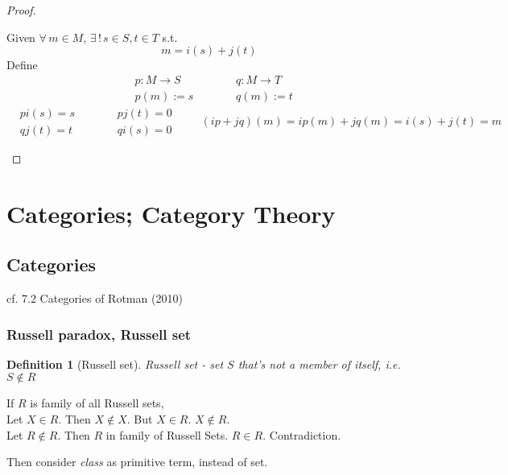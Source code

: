 \documentclass[10pt]{amsart}
\newtheorem{definition}{Definition}
\begin{document}
\begin{multicols*}{2}
\begin{proof}
\begin{itemize}
Given $\forall \, m \in M$, $\exists \, ! \, s\in S,t\in T$ s.t. 
\[
m=i(s) + j(t)
\]
Define 
\[
\begin{aligned}
	& p:M \to S \\ 
	& p(m) := s
\end{aligned} \qquad \, \begin{aligned}
	& q: M \to T \\ 
	& q(m) := t
\end{aligned}
\]
\[
\begin{aligned}
	& pi(s) = s \\ 
	& qj(t) = t 
\end{aligned} \qquad \, \begin{aligned}
& pj(t) =0  \\
& qi(s) = 0 \end{aligned} \qquad \, 
(ip+jq)(m) = ip(m) + jq(m) = i(s) + j(t) = m 
\]
\end{itemize}
\end{proof}

\section{Categories; Category Theory}  

\subsection{Categories}

cf. 7.2 Categories of Rotman (2010) \cite{JRotman2010}

\subsubsection{Russell paradox, Russell set}  

\begin{definition}[Russell set]
Russell set  - set $S$ that's not a member of itself, i.e. $S\notin R$
\end{definition}

If $R$ is family of all Russell sets,  \\
Let $X\in R$.  Then $X\notin X$.  But $X\in R$.  $X\notin R$.  \\
Let $R\notin R$.  Then $R$ in family of Russell Sets.  $R\in R$.  Contradiction.  

Then consider \emph{class} as primitive term, instead of set.  


\end{multicols*}
\end{document}

